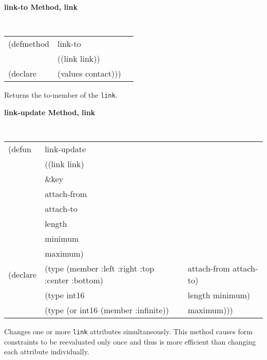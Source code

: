 {\samepage
{\large {\bf link-to \hfill Method, link}}
\begin{flushright} \parbox[t]{6.125in}{
\tt
\begin{tabular}{lll}
\raggedright
(defmethod & link-to & \\
           & ((link  link)) \\
(declare   & (values contact)))
\end{tabular}
\rm

}\end{flushright}}

\begin{flushright} \parbox[t]{6.125in}{
Returns the to-member of the {\tt link}.

}\end{flushright}


{\samepage
{\large {\bf link-update \hfill Method, link}} 
\begin{flushright} 
\parbox[t]{6.125in}{
\tt
\begin{tabular}{lll}
\raggedright
(defun & link-update & \\
&	  ((link link) \\
&          \&key \\
&	   attach-from &  \\
&	   attach-to   &  \\
&	   length      &  \\
&	   minimum     &  \\
&	   maximum)     &  \\
(declare & (type (member :left :right :top :center :bottom) & attach-from attach-to) \\ 
&	    (type int16	&			 length minimum) \\
&	    (type (or int16 (member :infinite))	& maximum))) \\

\end{tabular}
\rm

}\end{flushright}}

\begin{flushright} \parbox[t]{6.125in}{ 

Changes one or more {\tt link} attributes simultaneously. This method causes form
constraints to be reevaluated only once and thus is more efficient than changing
each attribute individually.

}\end{flushright}






